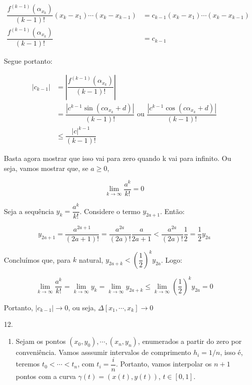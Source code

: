\documentclass{article}
\begin{document}
\begin{enumerate}
            \begin{align*}
                \dfrac{f^{(k-1)}(\alpha_{x_k})}{(k-1)!}(x_k-x_1)\cdots(x_k-x_{k-1}) &= c_{k-1} (x_k - x_1)\cdots(x_k - x_{k-1}) \\
                \dfrac{f^{(k-1)}(\alpha_{x_k})}{(k-1)!} &= c_{k-1}
            \end{align*}

            Segue portanto:

            \begin{align*}
                |c_{k-1}| &= \left|\dfrac{f^{(k-1)}(\alpha_{x_k})}{(k-1)!}\right| \\
                &= \dfrac{|c^{k-1} \sin(c \alpha_{x_k}+d)|}{(k-1)!} \textrm{ ou } \dfrac{|c^{k-1} \cos(c \alpha_{x_k}+d)|}{(k-1)!} \\
                &\le \dfrac{|c|^{k-1}}{(k-1)!}
            \end{align*}

            Basta agora mostrar que isso vai para zero quando k vai para infinito.
            Ou seja, vamos mostrar que, se $a \ge 0$,

            $$\lim_{k \to \infty} \dfrac{a^k}{k!} = 0$$

            Seja a sequência $y_k = \dfrac{a^k}{k!}$. Considere o termo $y_{2a+1}$. Então:

            $$y_{2a+1} = \dfrac{a^{2a+1}}{(2a+1)!} = \dfrac{a^{2a}}{(2a)!}\dfrac{a}{2a + 1} < \dfrac{a^{2a}}{(2a)!}\dfrac{1}{2} = \dfrac{1}{2} y_{2a}$$

            Concluímos que, para $k$ natural, $y_{2a+k} < \left(\dfrac{1}{2}\right)^k y_{2a}$. Logo:

            $$\lim_{k \to \infty} \dfrac{a^k}{k!} = \lim_{k \to \infty} y_k = \lim_{k \to \infty} y_{2a+k} \le \lim_{k \to \infty} \left(\dfrac{1}{2}\right)^k y_{2a} = 0$$

            Portanto, $|c_{k-1}| \to 0$, ou seja, $\Delta[x_1, \cdots, x_k] \to 0$

        \pagebreak

        \item[12.]
            \begin{enumerate}
                \item Sejam os pontos $(x_0, y_0), \cdots, (x_n, y_n)$,
                    enumerados a partir do zero por conveniência.
                    Vamos asssumir intervalos de comprimento $h_i = 1/n$,
                    isso é, teremos $t_0 < \cdots < t_n$,
                    com $t_i = \dfrac{i}{n}$.
                    Portanto, vamos interpolar os $n+1$ pontos
                    com a curva $\gamma(t) = (x(t), y(t))$, $t \in [0, 1]$.


\end{enumerate}
\end{enumerate}
\end{document}
